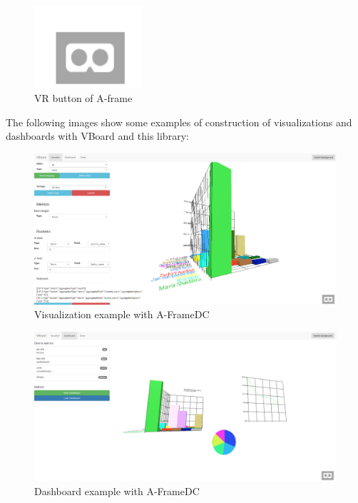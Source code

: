 \documentclass[a4paper, 12pt]{book}
\begin{document}
\begin{figure}[H]
  \centering
  \includegraphics[width=4cm, keepaspectratio]{img/development/vrbutton}
  \caption{VR button of A-frame}
  \label{fig:examplestandalone}
\end{figure}

The following images show some examples of construction of visualizations and dashboards with VBoard and this library:

\begin{figure}[H]
  \centering
  \includegraphics[width=16cm, keepaspectratio]{img/development/examplevisaframedc}
  \caption{Visualization example with A-FrameDC}
  \label{fig:examplestandalone}
\end{figure}

\begin{figure}[H]
  \centering
  \includegraphics[width=16cm, keepaspectratio]{img/development/dashtestaframedc}
  \caption{Dashboard example with A-FrameDC}
  \label{fig:examplestandalone}
\end{figure}
\end{document}
